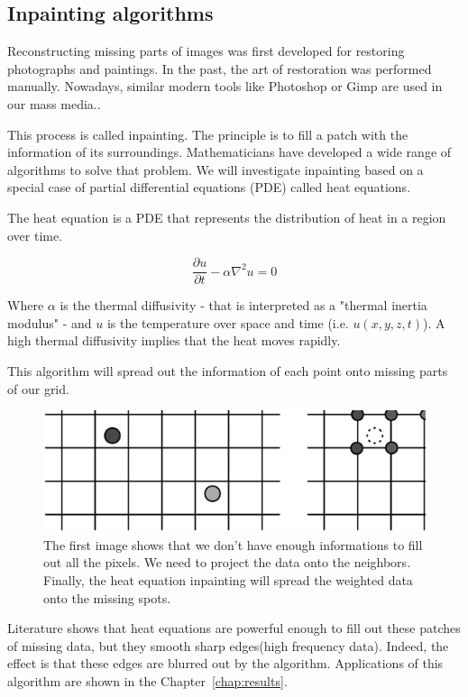 \subsection{Inpainting algorithms}

Reconstructing missing parts of images was first developed for restoring photographs and paintings. In the past, the art of restoration was performed manually. Nowadays, similar modern tools like Photoshop or Gimp are used in our mass media.\cite{richard2001fast}.

This process is called inpainting. The principle is to fill a patch with the information of its surroundings. Mathematicians have developed a wide range of algorithms to solve that problem. We will investigate inpainting based on a special case of partial differential equations (PDE) called heat equations. 

The heat equation is a PDE that represents the distribution of heat in a region over time. 

\begin{equation}\label{eqn:heateq}
\frac{\partial u}{\partial t} - \alpha \nabla^2 u = 0
\end{equation}

Where $\alpha$ is the thermal diffusivity - that is interpreted as a "thermal inertia modulus" - and $u$ is the temperature over space and time (i.e. $u(x,y,z,t)$). A high thermal diffusivity implies that the heat moves rapidly.

This algorithm will spread out the information of each point onto missing parts of our grid.

\begin{figure}[!ht]
  \centering
  \includegraphics[scale=0.3]{images/inpainting3step.eps}
    \caption{The first image shows that we don't have enough informations to fill out all the pixels. We need to project the data onto the neighbors. Finally, the heat equation inpainting will spread the weighted data onto the missing spots.}
  \label{inpainting3step}
\end{figure}

Literature shows that heat equations are powerful enough to fill out these patches of missing data, but they smooth sharp edges(high frequency data)\cite{aubert2006mathematical}. Indeed, the effect is that these edges are blurred out by the algorithm. Applications of this algorithm are shown in the Chapter~\ref{chap:results}.


